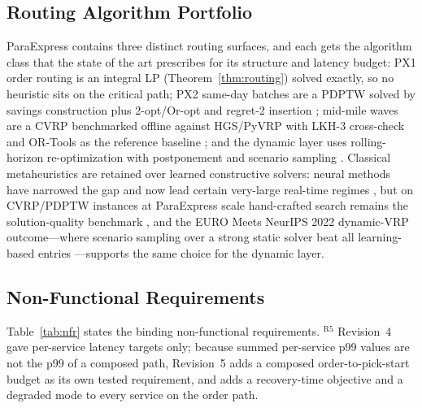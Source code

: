 \documentclass[10pt,twocolumn,letterpaper]{article}
\theoremstyle{definition}
\begin{document}
\subsection{Routing Algorithm Portfolio}
ParaExpress contains three distinct routing surfaces, and each gets the algorithm class that the state of the art prescribes for its structure and latency budget: PX1 order routing is an integral LP (Theorem~\ref{thm:routing}) solved exactly, so no heuristic sits on the critical path; PX2 same-day batches are a PDPTW solved by savings construction plus 2-opt/Or-opt and regret-2 insertion \cite{clarke1964,ropke2006}; mid-mile waves are a CVRP benchmarked offline against HGS/PyVRP \cite{vidal2022,wouda2024} with LKH-3 cross-check \cite{helsgaun2017} and OR-Tools as the reference baseline \cite{ortools2025}; and the dynamic layer uses rolling-horizon re-optimization with postponement and scenario sampling \cite{klapp2018,ulmer2021,lan2024}. Classical metaheuristics are retained over learned constructive solvers: neural methods have narrowed the gap and now lead certain very-large real-time regimes \cite{kool2019,kwon2020,luo2023,ye2024}, but on CVRP/PDPTW instances at ParaExpress scale hand-crafted search remains the solution-quality benchmark \cite{vidal2022,voigt2025,christiaens2020}, and the EURO Meets NeurIPS 2022 dynamic-VRP outcome---where scenario sampling over a strong static solver beat all learning-based entries \cite{lan2024}---supports the same choice for the dynamic layer.

\subsection{Non-Functional Requirements}
Table~\ref{tab:nfr} states the binding non-functional requirements. $^{\mathrm{R5}}$ Revision~4 gave per-service latency targets only; because summed per-service p99 values are not the p99 of a composed path, Revision~5 adds a composed order-to-pick-start budget as its own tested requirement, and adds a recovery-time objective and a degraded mode to every service on the order path.
\end{document}
